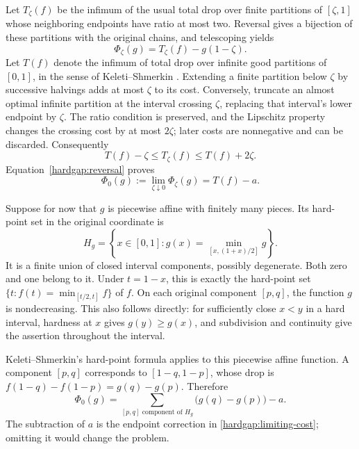 Let \(T_\zeta(f)\) be the infimum of the usual total drop over
finite partitions of \([\zeta,1]\) whose neighboring endpoints have
ratio at most two. Reversal gives a bijection of these partitions with
the original chains, and telescoping yields
\begin{equation}\label{hardgap:reversal}
 \Phi_\zeta(g)=T_\zeta(f)-g(1-\zeta).
\end{equation}
Let \(T(f)\) denote the infimum of total drop over infinite good
partitions of \([0,1]\), in the sense of Keleti--Shmerkin
\cite[Definition 5.1]{ks}. Extending a finite partition below \(\zeta\)
by successive halvings adds at most \(\zeta\) to its cost. Conversely,
truncate an almost optimal infinite partition at the interval crossing
\(\zeta\), replacing that interval's lower endpoint by \(\zeta\).
The ratio condition is preserved, and the Lipschitz property changes the
crossing cost by at most \(2\zeta\); later costs are nonnegative and
can be discarded. Consequently
\[
 T(f)-\zeta\le T_\zeta(f)\le T(f)+2\zeta.
\]
Equation~\eqref{hardgap:reversal} proves
\begin{equation}\label{hardgap:limiting-cost}
 \Phi_0(g):=\lim_{\zeta\downarrow0}\Phi_\zeta(g)=T(f)-a.
\end{equation}

Suppose for now that \(g\) is piecewise affine with finitely many pieces.
Its hard-point set in the original coordinate is
\[
 H_g=\left\{x\in[0,1]:
           g(x)=\min_{[x,(1+x)/2]}g\right\}.
\]
It is a finite union of closed interval components, possibly degenerate.
Both zero and one belong to it. Under \(t=1-x\), this is exactly the
hard-point set \(\{t:f(t)=\min_{[t/2,t]}f\}\) of \(f\).
On each original component \([p,q]\), the function \(g\) is
nondecreasing. This also follows directly: for sufficiently close
\(x<y\) in a hard interval, hardness at \(x\) gives
\(g(y)\ge g(x)\), and subdivision and continuity give the assertion
throughout the interval.

Keleti--Shmerkin's hard-point formula
\cite[Lemma 5.4]{ks} applies to this piecewise affine function. A component
\([p,q]\) corresponds to \([1-q,1-p]\), whose drop is
\(f(1-q)-f(1-p)=g(q)-g(p)\). Therefore
\begin{equation}\label{hardgap:identity}
 \Phi_0(g)=
 \sum_{[p,q]\text{ component of }H_g}\bigl(g(q)-g(p)\bigr)-a.
\end{equation}
The subtraction of \(a\) is the endpoint correction in
\eqref{hardgap:limiting-cost}; omitting it would change the problem.

